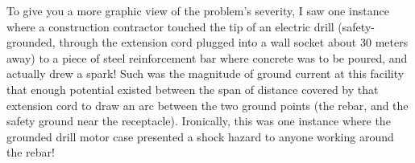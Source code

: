 To give you a more graphic view of the problem's severity, I saw one instance where a construction contractor touched the tip of an electric drill (safety-grounded, through the extension cord plugged into a wall socket about 30 meters away) to a piece of steel reinforcement bar where concrete was to be poured, and actually drew a spark!  Such was the magnitude of ground current at this facility that enough potential existed between the span of distance covered by that extension cord to draw an arc between the two ground points (the rebar, and the safety ground near the receptacle).  Ironically, this was one instance where the grounded drill motor case presented a shock hazard to anyone working around the rebar!




